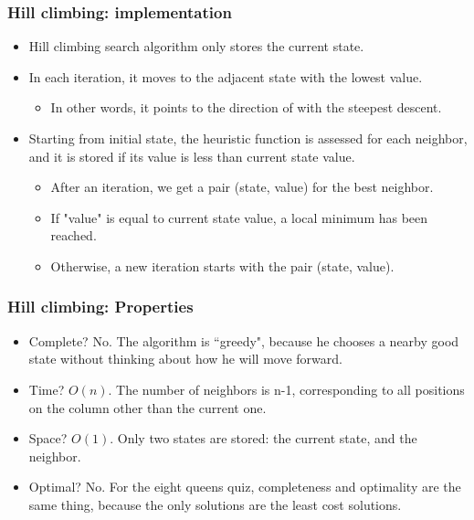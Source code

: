 \documentclass{beamer}
\begin{document}
    \begin{frame}
    \frametitle{Hill climbing: implementation}
        \begin{itemize}
            \item Hill climbing search algorithm only stores the current state.
            \pause
            \item In each iteration, it moves to the adjacent state with the lowest value.
            \pause
            \begin{itemize}
                \item In other words, it points to the direction of with the steepest descent.
            \end{itemize}
            \pause
            \item Starting from initial state, the heuristic function is assessed for each neighbor, and it is stored if its value is less than current state value.
            \pause
            \begin{itemize}
                \item After an iteration, we get a pair (state, value) for the best neighbor.
                \pause
                \item If "value" is equal to current state value, a local minimum has been reached.
                \pause
                \item Otherwise, a new iteration starts with the pair (state, value).
            \end{itemize} 
        \end{itemize}
    \end{frame}

    \begin{frame}
    \frametitle{Hill climbing: Properties}
     \begin{itemize}
         \item Complete? \pause No.
         \pause The algorithm is ``greedy", because he chooses a nearby good state without thinking about how he will move forward.
         \pause
         \item Time? \pause 
         \begin{math}O(n).\end{math}
         \pause The number of neighbors is n-1, corresponding to all positions on the column other than the current one.
         \pause
         \item Space? \pause
         \begin{math}O(1).\end{math}
         \pause Only two states are stored: the current state, and the neighbor.
         \pause
         \item Optimal? \pause No. 
         \pause For the eight queens quiz, completeness and optimality are the same thing, because the only solutions are the least cost solutions.  
     \end{itemize}   
    \end{frame}
\end{document}
